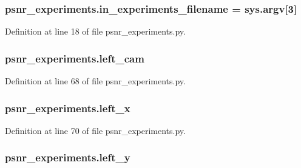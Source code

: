 \subsubsection[{\texorpdfstring{in\+\_\+experiments\+\_\+filename}{in_experiments_filename}}]{\setlength{\rightskip}{0pt plus 5cm}psnr\+\_\+experiments.\+in\+\_\+experiments\+\_\+filename = sys.\+argv\mbox{[}3\mbox{]}}\hypertarget{namespacepsnr__experiments_a32f07a4a298cf1838c1266dcbb7c768f}{}\label{namespacepsnr__experiments_a32f07a4a298cf1838c1266dcbb7c768f}


Definition at line 18 of file psnr\+\_\+experiments.\+py.

\subsubsection[{\texorpdfstring{left\+\_\+cam}{left_cam}}]{\setlength{\rightskip}{0pt plus 5cm}psnr\+\_\+experiments.\+left\+\_\+cam}\hypertarget{namespacepsnr__experiments_a73bc4364dfa07a7d47d805235227b20b}{}\label{namespacepsnr__experiments_a73bc4364dfa07a7d47d805235227b20b}


Definition at line 68 of file psnr\+\_\+experiments.\+py.

\subsubsection[{\texorpdfstring{left\+\_\+x}{left_x}}]{\setlength{\rightskip}{0pt plus 5cm}psnr\+\_\+experiments.\+left\+\_\+x}\hypertarget{namespacepsnr__experiments_a8a6c602a87ff03d2d46adca89a1e40a6}{}\label{namespacepsnr__experiments_a8a6c602a87ff03d2d46adca89a1e40a6}


Definition at line 70 of file psnr\+\_\+experiments.\+py.

\subsubsection[{\texorpdfstring{left\+\_\+y}{left_y}}]{\setlength{\rightskip}{0pt plus 5cm}psnr\+\_\+experiments.\+left\+\_\+y}\hypertarget{namespacepsnr__experiments_a42d4bc5bf8a4d16a6ad24adc915524c9}{}\label{namespacepsnr__experiments_a42d4bc5bf8a4d16a6ad24adc915524c9}


